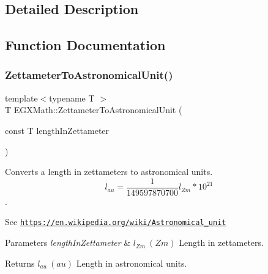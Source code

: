 \subsection{Detailed Description}


\subsection{Function Documentation}
\mbox{\label{group___e_g_x_math-_conversions-_length_conversions-_zettameter-_astronomical_ga11b503418631f04db17ad979cef5403a}} 
\subsubsection{\texorpdfstring{Zettameter\+To\+Astronomical\+Unit()}{ZettameterToAstronomicalUnit()}}
{\footnotesize\ttfamily template$<$typename T $>$ \\
T E\+G\+X\+Math\+::\+Zettameter\+To\+Astronomical\+Unit (\begin{DoxyParamCaption}\item[{const T}]{length\+In\+Zettameter }\end{DoxyParamCaption})}



Converts a length in zettameters to astronomical units. \[ l_{au}= \frac{1}{149597870700} l_{Zm} * 10^{21} \]. 

See \href{https://en.wikipedia.org/wiki/Astronomical_unit}{\tt https\+://en.\+wikipedia.\+org/wiki/\+Astronomical\+\_\+unit} 
\begin{DoxyParams}{Parameters}
{\em length\+In\+Zettameter} & $ l_{Zm}\ (Zm)$ Length in zettameters. \\
\hline
\end{DoxyParams}
\begin{DoxyReturn}{Returns}
$ l_{au}\ (au)$ Length in astronomical units. 
\end{DoxyReturn}
\mbox{\label{group___e_g_x_math-_conversions-_length_conversions-_zettameter-_astronomical_gacc76b416d7b6b3c4bd30cf8c5e924daf}} 
